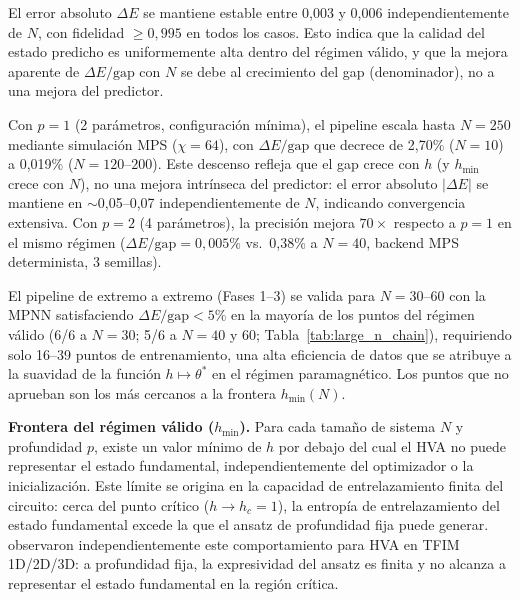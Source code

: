 \documentclass[11pt,a4paper,spanish]{book}
\begin{document}
El error absoluto $\Delta E$ se mantiene estable entre 0,003 y 0,006 independientemente de $N$, con fidelidad $\geq 0,995$ en todos los casos. Esto indica que la calidad del estado predicho es uniformemente alta dentro del régimen válido, y que la mejora aparente de $\Delta E/\text{gap}$ con $N$ se debe al crecimiento del gap (denominador), no a una mejora del predictor.

Con $p = 1$ (2 parámetros, configuración mínima), el pipeline escala hasta $N = 250$ mediante simulación MPS ($\chi = 64$), con $\Delta E/\text{gap}$ que decrece de 2,70\% ($N = 10$) a 0,019\% ($N = 120$--$200$). Este descenso refleja que el gap crece con $h$ (y $h_{\min}$ crece con $N$), no una mejora intrínseca del predictor: el error absoluto $|\Delta E|$ se mantiene en $\sim$0,05--0,07 independientemente de $N$, indicando convergencia extensiva. Con $p = 2$ (4 parámetros), la precisión mejora $70\times$ respecto a $p = 1$ en el mismo régimen ($\Delta E/\text{gap} = 0,005\%$ vs.\ 0,38\% a $N = 40$, backend MPS determinista, 3 semillas).

El pipeline de extremo a extremo (Fases 1--3) se valida para $N = 30$--$60$ con la MPNN satisfaciendo $\Delta E/\text{gap} < 5\%$ en la mayoría de los puntos del régimen válido (6/6 a $N = 30$; 5/6 a $N = 40$ y $60$; Tabla~\ref{tab:large_n_chain}), requiriendo solo 16--39 puntos de entrenamiento, una alta eficiencia de datos que se atribuye a la suavidad de la función $h \mapsto \theta^*$ en el régimen paramagnético. Los puntos que no aprueban son los más cercanos a la frontera $h_{\min}(N)$.

\textbf{Frontera del régimen válido ($h_{\min}$).} Para cada tamaño de sistema $N$ y profundidad $p$, existe un valor mínimo de $h$ por debajo del cual el HVA no puede representar el estado fundamental, independientemente del optimizador o la inicialización. Este límite se origina en la capacidad de entrelazamiento finita del circuito: cerca del punto crítico ($h \to h_c = 1$), la entropía de entrelazamiento del estado fundamental excede la que el ansatz de profundidad fija puede generar. \citet{tripathi2026} observaron independientemente este comportamiento para HVA en TFIM 1D/2D/3D: a profundidad fija, la expresividad del ansatz es finita y no alcanza a representar el estado fundamental en la región crítica.
\end{document}
